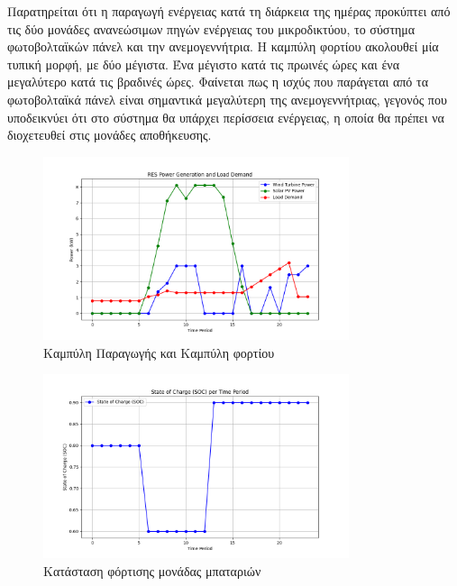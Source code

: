 Παρατηρείται ότι η παραγωγή ενέργειας κατά τη διάρκεια της ημέρας προκύπτει από τις δύο μονάδες ανανεώσιμων πηγών ενέργειας του μικροδικτύου, το σύστημα φωτοβολταϊκών πάνελ και την ανεμογεννήτρια. Η καμπύλη φορτίου ακολουθεί μία τυπική μορφή, με δύο μέγιστα. Ένα μέγιστο κατά τις πρωινές ώρες και ένα μεγαλύτερο κατά τις βραδινές ώρες. Φαίνεται πως η ισχύς που παράγεται από τα φωτοβολταϊκά πάνελ είναι σημαντικά μεγαλύτερη της ανεμογεννήτριας, γεγονός που υποδεικνύει ότι στο σύστημα θα υπάρχει περίσσεια ενέργειας, η οποία θα πρέπει να διοχετευθεί στις μονάδες αποθήκευσης. 

\begin{figure}[H]  %
    \centering
    \includegraphics[width=0.8\textwidth]{figures/Figure_4.png}  %
    \caption{Καμπύλη Παραγωγής και Καμπύλη φορτίου}
    \label{fig:my_label}
\end{figure}


\begin{figure}[H]  %
    \centering
    \includegraphics[width=0.8\textwidth]{figures/Figure_5.png}  %
    \caption{Κατάσταση φόρτισης μονάδας μπαταριών}
    \label{fig:my_label}
\end{figure}

